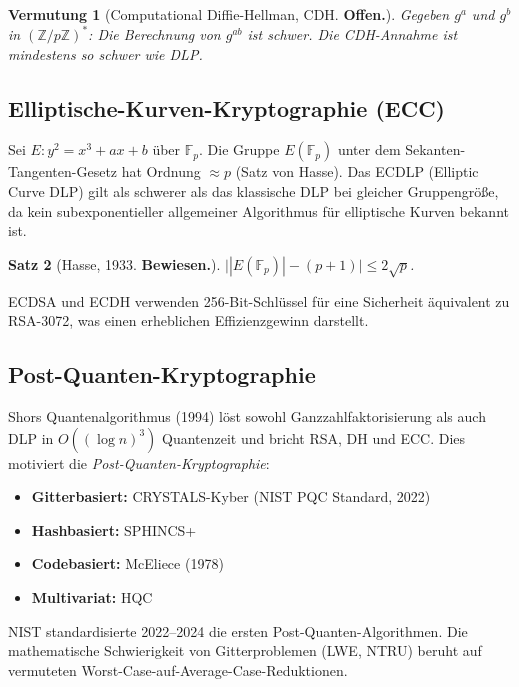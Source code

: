 \documentclass[12pt,a4paper]{amsart}
\newtheorem{theorem}{Satz}[section]
\newtheorem{vermutung}[theorem]{Vermutung}
\theoremstyle{definition}
\begin{document}
\begin{vermutung}[Computational Diffie-Hellman, CDH. \textbf{Offen.}]
Gegeben $g^a$ und $g^b$ in $(\mathbb{Z}/p\mathbb{Z})^*$: Die Berechnung von
$g^{ab}$ ist schwer. Die CDH-Annahme ist mindestens so schwer wie DLP.
\end{vermutung}

\subsection{Elliptische-Kurven-Kryptographie (ECC)}

Sei $E: y^2 = x^3 + ax + b$ über $\mathbb{F}_p$. Die Gruppe $E(\mathbb{F}_p)$
unter dem Sekanten-Tangenten-Gesetz hat Ordnung $\approx p$ (Satz von Hasse).
Das ECDLP (Elliptic Curve DLP) gilt als schwerer als das klassische DLP bei
gleicher Gruppengröße, da kein subexponentieller allgemeiner Algorithmus für
elliptische Kurven bekannt ist.

\begin{theorem}[Hasse, 1933. \textbf{Bewiesen.}]
$\bigl||E(\mathbb{F}_p)| - (p+1)\bigr| \le 2\sqrt{p}$.
\end{theorem}

ECDSA und ECDH verwenden 256-Bit-Schlüssel für eine Sicherheit äquivalent zu
RSA-3072, was einen erheblichen Effizienzgewinn darstellt.

\subsection{Post-Quanten-Kryptographie}

Shors Quantenalgorithmus (1994) löst sowohl Ganzzahlfaktorisierung als auch DLP
in $O((\log n)^3)$ Quantenzeit und bricht RSA, DH und ECC. Dies motiviert die
\emph{Post-Quanten-Kryptographie}:

\begin{itemize}
  \item \textbf{Gitterbasiert:} CRYSTALS-Kyber (NIST PQC Standard, 2022)
  \item \textbf{Hashbasiert:} SPHINCS+
  \item \textbf{Codebasiert:} McEliece (1978)
  \item \textbf{Multivariat:} HQC
\end{itemize}

NIST standardisierte 2022--2024 die ersten Post-Quanten-Algorithmen. Die
mathematische Schwierigkeit von Gitterproblemen (LWE, NTRU) beruht auf
vermuteten Worst-Case-auf-Average-Case-Reduktionen.
\end{document}
